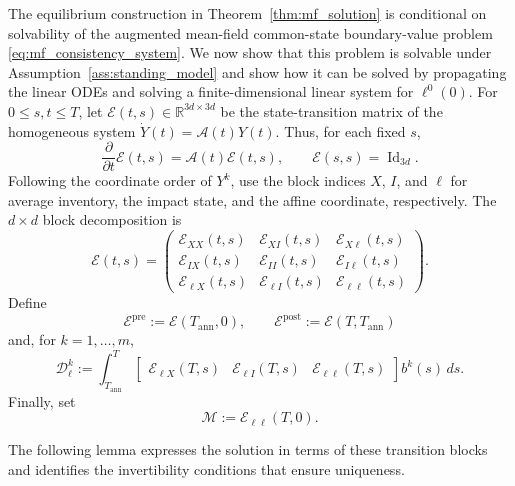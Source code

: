 \documentclass[12pt]{article}
\numberwithin{equation}{section}
\theoremstyle{definition}
\begin{document}
The equilibrium construction in Theorem~\ref{thm:mf_solution} is conditional
on solvability of the augmented mean-field common-state boundary-value problem
\eqref{eq:mf_consistency_system}. We now show that this problem is solvable
under Assumption~\ref{ass:standing_model} and show how it can be solved by
propagating the linear ODEs and solving a finite-dimensional linear system for
\(\ell^0(0)\). For
\(0\le s,t\le T\), let
\(\mathcal E(t,s)\in\mathbb R^{3d\times3d}\) be the state-transition matrix
of the homogeneous system
\(\dot{Y}(t)=\mathcal A(t)Y(t)\). Thus, for each fixed \(s\),
\[
\frac{\partial}{\partial t}\mathcal E(t,s)
=
\mathcal A(t)\mathcal E(t,s),
\qquad
\mathcal E(s,s)=\operatorname{Id}_{3d}.
\]
Following the coordinate order of \(Y^k\), use the block indices
\(X\), \(I\), and \(\ell\) for average inventory, the impact state, and the
affine coordinate, respectively. The \(d\times d\) block decomposition is
\[
\mathcal E(t,s)
=
\begin{pmatrix}
\mathcal E_{XX}(t,s)&\mathcal E_{XI}(t,s)&\mathcal E_{X\ell}(t,s)\\
\mathcal E_{IX}(t,s)&\mathcal E_{II}(t,s)&\mathcal E_{I\ell}(t,s)\\
\mathcal E_{\ell X}(t,s)&\mathcal E_{\ell I}(t,s)&\mathcal E_{\ell\ell}(t,s)
\end{pmatrix}.
\]
Define
\[
\mathcal E^{\mathrm{pre}}:=\mathcal E(T_{\mathrm{ann}},0),
\qquad
\mathcal E^{\mathrm{post}}:=\mathcal E(T,T_{\mathrm{ann}})
\]
and, for \(k=1,\ldots,m\),
\begin{equation}\label{eq:mf_post_forcing_ell}
\mathcal D_\ell^k
:=
\int_{T_{\mathrm{ann}}}^T
\begin{bmatrix}
\mathcal E_{\ell X}(T,s)&\mathcal E_{\ell I}(T,s)&\mathcal E_{\ell\ell}(T,s)
\end{bmatrix}
b^k(s)\,ds.
\end{equation}
Finally, set
\begin{equation}\label{eq:mf_matching_matrix}
\mathcal M:=\mathcal E_{\ell\ell}(T,0).
\end{equation}

The following lemma expresses the solution in terms of these transition blocks
and identifies the invertibility conditions that ensure uniqueness.
\end{document}
